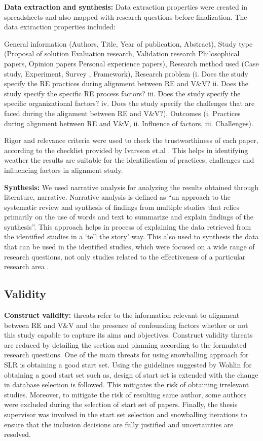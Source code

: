 \documentclass{article}
\begin{document}
\textbf{Data extraction and synthesis:} Data extraction properties were created in spreadsheets and also mapped with research questions before finalization. The data extraction properties included: 

General information (Authors, Title, Year of publication, Abstract), Study type (Proposal of solution Evaluation research, Validation research Philosophical papers, Opinion papers
Personal experience papers), Research method used (Case study,  Experiment,  Survey ,  Framework), Research problem (i. Does the study specify the RE practices during alignment between RE and V\&V? ii.	Does the study specify the specific RE process factors? iii.	Does the study specify the specific organizational factors? iv.	Does the study specify the challenges that are faced during the alignment between RE and V\&V?), Outcomes (i.	Practices during alignment between RE and V\&V, ii.	Influence of factors, iii.	Challenges).


Rigor and relevance criteria were used to check the trustworthiness of each paper, according to the checklist provided by Ivarsson et.al \cite{ivarsson2011method}. This helps in identifying weather the results are suitable for the identification of practices, challenges and influencing factors in alignment study.


\textbf{Synthesis:} We used narrative analysis for analyzing the results obtained through literature, narrative. Narrative analysis is defined as “an approach to the systematic review and synthesis of findings from multiple studies that relies primarily on the use of words and text to summarize and explain findings of the synthesis”. This approach helps in process of explaining the data retrieved from the identified studies in a ‘tell the story’ way. This also used to synthesis the data that can be used in the identified studies, which were focused on a wide range of research questions, not only studies related to the effectiveness of a particular research area \cite{popay2006guidance}.


\subsection{Validity}


\textbf{Construct validity:} threats refer to the information relevant to alignment between RE and V\&V and the presence of confounding factors whether or not this study capable to capture its aims and objectives. Construct validity threats are reduced by detailing the section and planning according to the formulated research questions. One of the main threats for using snowballing approach for SLR is obtaining a good start set. Using the guidelines suggested by Wohlin \cite{wohlin2014guidelines} for obtaining a good start set such as, design of start set is extended with the change in database selection is followed. This mitigates the risk of obtaining irrelevant studies. Moreover, to mitigate the risk of resulting same author, some authors were excluded during the selection of start set of papers. Finally, the thesis supervisor was involved in the start set selection and snowballing iterations to ensure that the inclusion decisions are fully justified and uncertainties are resolved.
\end{document}
